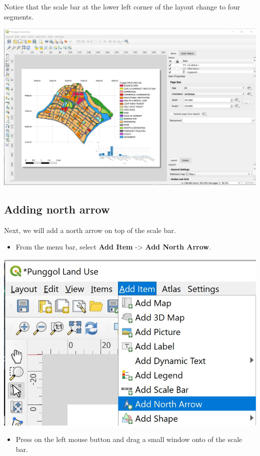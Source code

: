 \documentclass[
  letterpaper,
  DIV=11,
  numbers=noendperiod]{scrreprt}
\providecommand{\tightlist}{%
  \setlength{\itemsep}{0pt}\setlength{\parskip}{0pt}}\usepackage{longtable,booktabs,array}
\begin{document}
Notice that the scale bar at the lower left corner of the layout change
to four segments.

\includegraphics{./img04/image78.jpg}

\hypertarget{adding-north-arrow}{%
\subsection{Adding north arrow}\label{adding-north-arrow}}

Next, we will add a north arrow on top of the scale bar.

\begin{itemize}
\tightlist
\item
  From the menu bar, select \textbf{Add Item} -\textgreater{}
  \textbf{Add North Arrow}.
\end{itemize}

\includegraphics{./img04/image79.jpg}

\begin{itemize}
\tightlist
\item
  Press on the left mouse button and drag a small window onto of the
  scale bar.
\end{itemize}
\end{document}
